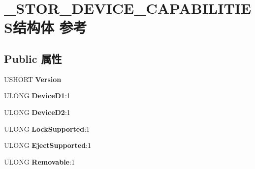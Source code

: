 \hypertarget{struct___s_t_o_r___d_e_v_i_c_e___c_a_p_a_b_i_l_i_t_i_e_s}{}\section{\+\_\+\+S\+T\+O\+R\+\_\+\+D\+E\+V\+I\+C\+E\+\_\+\+C\+A\+P\+A\+B\+I\+L\+I\+T\+I\+E\+S结构体 参考}
\label{struct___s_t_o_r___d_e_v_i_c_e___c_a_p_a_b_i_l_i_t_i_e_s}
\subsection*{Public 属性}
\begin{DoxyCompactItemize}
\item 
\mbox{\label{struct___s_t_o_r___d_e_v_i_c_e___c_a_p_a_b_i_l_i_t_i_e_s_a730d49db5a7ed3a0d5258ab9d23895a1}} 
U\+S\+H\+O\+RT {\bfseries Version}
\item 
\mbox{\label{struct___s_t_o_r___d_e_v_i_c_e___c_a_p_a_b_i_l_i_t_i_e_s_a40682db5c2485a067605b13d0e75f970}} 
U\+L\+O\+NG {\bfseries Device\+D1}\+:1
\item 
\mbox{\label{struct___s_t_o_r___d_e_v_i_c_e___c_a_p_a_b_i_l_i_t_i_e_s_a6403a51f80df23670107307dc96e9d94}} 
U\+L\+O\+NG {\bfseries Device\+D2}\+:1
\item 
\mbox{\label{struct___s_t_o_r___d_e_v_i_c_e___c_a_p_a_b_i_l_i_t_i_e_s_ad520ba749c37c6b304353e719915ac7c}} 
U\+L\+O\+NG {\bfseries Lock\+Supported}\+:1
\item 
\mbox{\label{struct___s_t_o_r___d_e_v_i_c_e___c_a_p_a_b_i_l_i_t_i_e_s_a035c477ab4f9f863c8b57dd382cb1dfd}} 
U\+L\+O\+NG {\bfseries Eject\+Supported}\+:1
\item 
\mbox{\label{struct___s_t_o_r___d_e_v_i_c_e___c_a_p_a_b_i_l_i_t_i_e_s_a4444d0299f51da1cec5cdbc4e8c701b4}} 
U\+L\+O\+NG {\bfseries Removable}\+:1

\end{DoxyCompactItemize}
